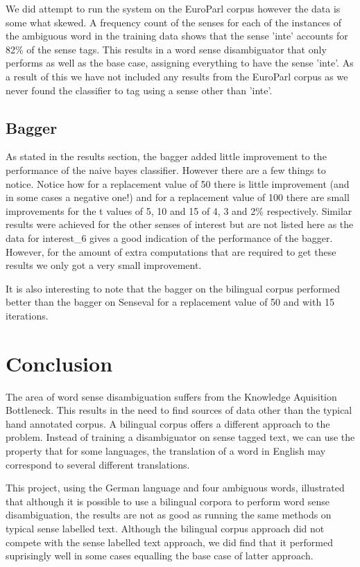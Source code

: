 \documentclass[a4wide,10pt]{article}
\begin{document}
We did attempt to run the system on the EuroParl corpus however the data is
some what skewed.  A frequency count of the senses for each of the instances
of the ambiguous word in the training data shows that the sense 'inte'
accounts for 82\% of the sense tags.  This results in a word sense disambiguator
that only performs as well as the base case, assigning everything to have
the sense 'inte'.
As a result of this we have not included any results from the EuroParl corpus
as we never found the classifier to tag using a sense other than 'inte'.

\subsection{Bagger}
As stated in the results section, the bagger added little improvement to
the performance of the naive bayes classifier.
However there are a few things to notice.
Notice how for a replacement value of 50 there is little improvement
 (and in some cases
a negative one!)  and for a replacement value of 100 there are small 
improvements for the t values of 5, 10 and 15 of 4, 3 and 2\% respectively.
Similar results were achieved for the other senses of interest but are not 
listed here as the data for interest\_6 gives a good indication of the 
performance of the bagger.
However, for the amount of extra computations that are required to get these 
results we only got a very small improvement.

It is also interesting to note that the bagger on the bilingual corpus performed
better than the bagger on Senseval for a replacement value of 50 and with 15
iterations.


\section{Conclusion}

The area of word sense disambiguation suffers from the
Knowledge Aquisition Bottleneck.  This results in the need to find
sources of data other than the typical hand annotated corpus.
A bilingual corpus offers a different approach to the problem.
Instead of training a disambiguator on sense tagged text, we can use 
the
property that for some languages, the translation of a word in English
may correspond to several different translations.

This project, using the German language and four ambiguous words,
illustrated
that although it is possible to use a bilingual corpora to perform
word sense disambiguation, the results are not as good as running the
same methods on typical sense labelled text.
Although the bilingual corpus approach did not compete with the
sense labelled text approach, we did find that it performed suprisingly
well in some cases equalling the base case of latter approach.
\end{document}
